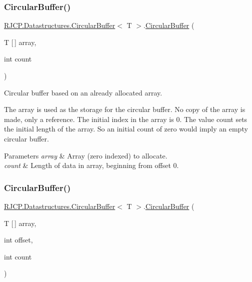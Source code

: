 \subsubsection{\texorpdfstring{CircularBuffer()}{CircularBuffer()}\hspace{0.1cm}{\footnotesize\ttfamily [3/4]}}
{\footnotesize\ttfamily \mbox{\hyperlink{class_r_j_c_p_1_1_datastructures_1_1_circular_buffer}{R\+J\+C\+P.\+Datastructures.\+Circular\+Buffer}}$<$ T $>$.\mbox{\hyperlink{class_r_j_c_p_1_1_datastructures_1_1_circular_buffer}{Circular\+Buffer}} (\begin{DoxyParamCaption}\item[{T \mbox{[}$\,$\mbox{]}}]{array,  }\item[{int}]{count }\end{DoxyParamCaption})}



Circular buffer based on an already allocated array. 

The array is used as the storage for the circular buffer. No copy of the array is made, only a reference. The initial index in the array is 0. The value {\ttfamily count} sets the initial length of the array. So an initial {\ttfamily count} of zero would imply an empty circular buffer. 


\begin{DoxyParams}{Parameters}
{\em array} & Array (zero indexed) to allocate.\\
\hline
{\em count} & Length of data in array, beginning from offset 0.\\
\hline
\end{DoxyParams}
\mbox{\label{class_r_j_c_p_1_1_datastructures_1_1_circular_buffer_a48d3cf3ad804cd6b22e921de5f93dc12}} 
\subsubsection{\texorpdfstring{CircularBuffer()}{CircularBuffer()}\hspace{0.1cm}{\footnotesize\ttfamily [4/4]}}
{\footnotesize\ttfamily \mbox{\hyperlink{class_r_j_c_p_1_1_datastructures_1_1_circular_buffer}{R\+J\+C\+P.\+Datastructures.\+Circular\+Buffer}}$<$ T $>$.\mbox{\hyperlink{class_r_j_c_p_1_1_datastructures_1_1_circular_buffer}{Circular\+Buffer}} (\begin{DoxyParamCaption}\item[{T \mbox{[}$\,$\mbox{]}}]{array,  }\item[{int}]{offset,  }\item[{int}]{count }\end{DoxyParamCaption})}



